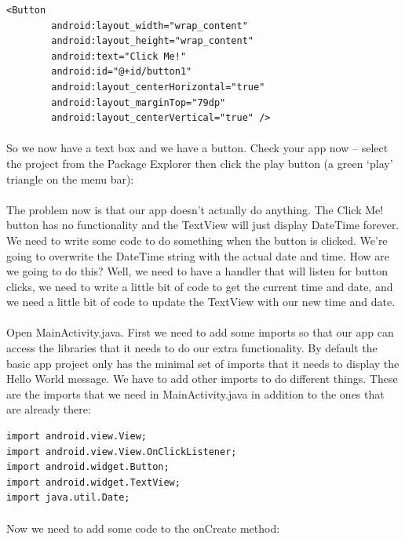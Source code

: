 \documentclass[12pt, a4paper, twoside]{book}
\begin{document}
\begin{lstlisting}
<Button
        android:layout_width="wrap_content"
        android:layout_height="wrap_content"
        android:text="Click Me!"
        android:id="@+id/button1"
        android:layout_centerHorizontal="true"
        android:layout_marginTop="79dp"
        android:layout_centerVertical="true" />
\end{lstlisting}

\paragraph{} So we now have a text box and we have a button. Check your app now – select the project from the Package Explorer then click the play button (a green `play' triangle on the menu bar):

\paragraph{} The problem now is that our app doesn't actually do anything. The Click Me! button has no functionality and the TextView will just display DateTime forever. We need to write some code to do something when the button is clicked. We’re going to overwrite the DateTime string with the actual date and time. How are we going to do this? Well, we need to have a handler that will listen for button clicks, we need to write a little bit of code to get the current time and date, and we need a little bit of code to update the TextView with our new time and date.

\paragraph{} Open MainActivity.java. First we need to add some imports so that our app can access the libraries that it needs to do our extra functionality. By default the basic app project only has the minimal set of imports that it needs to display the Hello World message. We have to add other imports to do different things. These are the imports that we need in MainActivity.java in addition to the ones that are already there:

\begin{lstlisting}
import android.view.View;
import android.view.View.OnClickListener;
import android.widget.Button;
import android.widget.TextView;
import java.util.Date;
\end{lstlisting}

\paragraph{} Now we need to add some code to the onCreate method:
\end{document}

